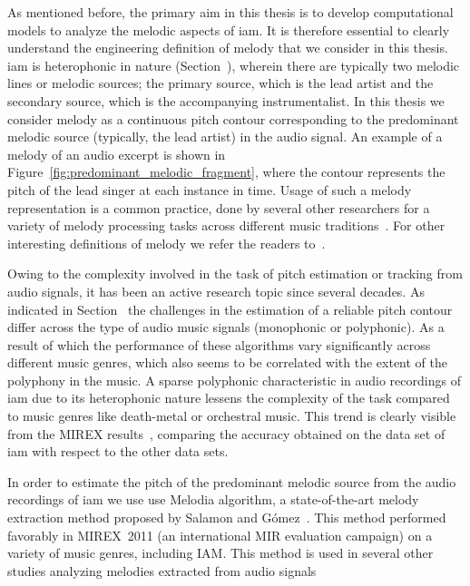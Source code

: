 As mentioned before, the primary aim in this thesis is to develop computational models to analyze the melodic aspects of \gls{iam}. It is therefore essential to clearly understand  the engineering definition of melody that we consider in this thesis. \Gls{iam} is heterophonic in nature (Section~), wherein there are typically two melodic lines or melodic sources; the primary source, which is the lead artist and the secondary source, which is the accompanying instrumentalist. In this thesis we consider melody as a continuous pitch contour corresponding to the predominant melodic source (typically, the lead artist) in the audio signal. An example of a melody of an audio excerpt is shown in Figure~\ref{fig:predominant_melodic_fragment}, where the contour represents the pitch of the lead singer at each instance in time. Usage of such a melody representation is a common practice, done by several other researchers for a variety of melody processing tasks across different music traditions~\citep{Dutta2014,Ishwar2013,Rao2014,koduri2014intonation,senturk2013score,pikrakis2012tracking}.  For other interesting definitions of melody we refer the readers to~\citep{Salamon2012}. 


Owing to the complexity involved in the task of pitch estimation or tracking from audio signals, it has been an active research topic since several decades. As indicated in Section~ the challenges in the estimation of a reliable pitch contour differ across the type of audio music signals (monophonic or polyphonic). As a result of which the performance of these algorithms vary significantly across different music genres, which also seems to be correlated with the extent of the polyphony in the music. A sparse polyphonic characteristic in audio recordings of \gls{iam} due to its heterophonic nature lessens the complexity of the task compared to music genres like death-metal or orchestral music. This trend is clearly visible from the MIREX results~, comparing the accuracy obtained on the data set of \gls{iam} with respect to the other data sets.

In order to estimate the pitch of the predominant melodic source from the audio recordings of \gls{iam} we use use Melodia algorithm, a state-of-the-art melody extraction method proposed by Salamon and G\'omez~\cite{Salamon2012}. This method performed favorably in MIREX~2011 (an international MIR evaluation campaign) on a variety of music genres, including IAM. This method is used in several other studies analyzing melodies extracted from audio signals~\citep{Dutta2014,Ishwar2013,Rao2014,koduri2014intonation,senturk2013score,pikrakis2012tracking}

